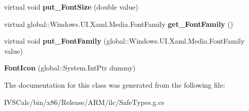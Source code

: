 \begin{DoxyCompactItemize}
\mbox{\label{class_windows_1_1_u_i_1_1_xaml_1_1_controls_1_1_font_icon_ab6e9c5d300ab27fe473978c6792a49a5}} 
virtual void {\bfseries put\+\_\+\+Font\+Size} (double value)
\item 
\mbox{\label{class_windows_1_1_u_i_1_1_xaml_1_1_controls_1_1_font_icon_a1ec67522af9017e450d6266855bc81d5}} 
virtual global\+::\+Windows.\+U\+I.\+Xaml.\+Media.\+Font\+Family {\bfseries get\+\_\+\+Font\+Family} ()
\item 
\mbox{\label{class_windows_1_1_u_i_1_1_xaml_1_1_controls_1_1_font_icon_a1f39590903627ddd712e1b20dba0c7ff}} 
virtual void {\bfseries put\+\_\+\+Font\+Family} (global\+::\+Windows.\+U\+I.\+Xaml.\+Media.\+Font\+Family value)
\item 
\mbox{\label{class_windows_1_1_u_i_1_1_xaml_1_1_controls_1_1_font_icon_a8416249e681423ded4616ce07522b6aa}} 
{\bfseries Font\+Icon} (global\+::\+System.\+Int\+Ptr dummy)
\end{DoxyCompactItemize}


The documentation for this class was generated from the following file\+:\begin{DoxyCompactItemize}
\item 
I\+V\+S\+Calc/bin/x86/\+Release/\+A\+R\+M/ilc/Safe\+Types.\+g.\+cs\end{DoxyCompactItemize}
